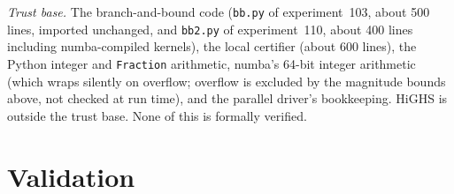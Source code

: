 \documentclass[11pt]{amsart}
\theoremstyle{definition}
\begin{document}
\noindent\emph{Trust base.} The branch-and-bound code (\texttt{bb.py} of experiment~103, about 500 lines, imported unchanged, and \texttt{bb2.py} of experiment~110, about 400 lines including numba-compiled kernels), the local certifier (about 600 lines), the Python integer and \texttt{Fraction} arithmetic, numba's 64-bit integer arithmetic (which wraps silently on overflow; overflow is excluded by the magnitude bounds above, not checked at run time), and the parallel driver's bookkeeping. HiGHS is outside the trust base. None of this is formally verified. %

\section{Validation}\label{sec:validation}
\end{document}
